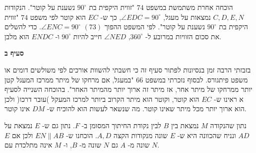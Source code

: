 \documentclass[12pt,a4paper]{article}
\newcommand*{\np}{\selectlanguage{english}\newpage\selectlanguage{hebrew}}
\begin{document}
\np

הוכחה אחרת משתמשת במשפט
$74$
"זווית היקפית בת 
$90^\circ$
נשענת על קוטר". הנקודות
$C,D,E,N$
נמצאות על מעגל, 
$\angle EDC=90^\circ$,
כך ש-%
$EC$
הוא קוטר לפי משפט
$74$
"זווית היקפית בת
$90^\circ$
נשענת על קוטר". לפי המשפט ההפוך
$(73)$
$\angle ENC=90^\circ$.
כדי להשלים את סכום הזוויות במרובע ל-%
$360^\circ$,
$\angle NED$
חייב להיות 
$90^\circ$
ו-%
$ENDC$
הוא מלבן.


\textbf{סעיף ב}

בזבזתי הרבה זמן בנסיונות לפתור סעיף זה כי חשבתי להשוות אורכים לפי משולשים דומים או משפט פיתגורס. לבסוף נזכרתי במשפט
$66$
"במעגל, אם מרחקו של מיתר ממרכז המעגל קטן יותר ממרחקו של מיתר אחר, אז מיתר זה ארוך יותר מהמיתר האחר". בהוכחה השנייה לסעיף א ראינו ש-%
$EC$
הוא קוטר, וקוטר הוא מיתר הקרוב ביותר למרכז המעקל )עובר דרכו( ולכן הוא ארוך יותר מכל מיתר שאינו קוטר. מה שנשאר לעשות הוא להוכיח ש-%
$DM$
אינו קוטר.

נתון שהנקודה
$M$
נמצאת בין 
$B$
לבין נקודת החיתוך המסומן ב-%
$F$.
נתון גם ש-%
$E$
נמצאת על
$AD$
ונניח שהכוונה היא ש-%
$E$
שונה מנקודות הקצה
$A,D$.
הוכחנו ש-%
$EN\|AB$
ולכן אם 
$E$
שונה מ-%
$A$
גם
$N$
שונה מ-%
$B$,
ו-%
$M$
אינה מתלכדת עם
$N$.
\vspace{-4mm}

\begin{center}
\end{center}
\end{document}
